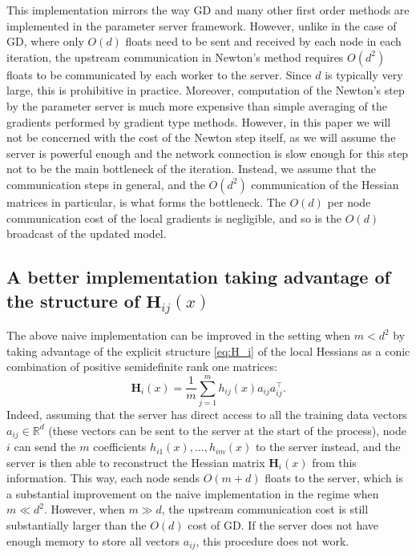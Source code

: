 \documentclass[12pt]{article}
\newcommand{\squeeze}{}
\newcommand{\R}{\mathbb{R}}
\newcommand{\newalpha}{h}
\newcommand{\mH}{\mathbf{H}}
\begin{document}
This implementation mirrors the way GD and many other first order methods are implemented in the parameter server framework. However, unlike in the case of GD, where only $O(d)$ floats need to be sent and received by each node in each iteration, the upstream communication in Newton's method requires $O(d^2)$ floats to be communicated by each worker to the server. Since $d$ is typically very large, this is prohibitive in practice. Moreover, computation of the Newton's step by the parameter server is much more expensive than simple averaging of the gradients performed by gradient type methods. However, in this paper we will not be concerned with the cost of the Newton step itself, as we will assume the server is powerful enough and the network connection is slow enough for this step not to be the main bottleneck of the iteration. Instead, we assume that the communication steps in general, and the $O(d^2)$ communication of the Hessian matrices in particular,  is what forms the bottleneck. The $O(d)$ per node communication cost of the local gradients is negligible,  and so is the $O(d)$ broadcast of the updated model.  

\subsection{A better implementation taking advantage of the structure of $\mH_{ij}(x)$} \label{subsec:Naive2}

The above naive implementation can be improved in the setting when $m < d^2$ by taking advantage of the explicit structure \eqref{eq:H_i} of the local Hessians as a conic combination of positive semidefinite rank one matrices:
\begin{equation}\label{eq:Newton2}
\squeeze\mH_i(x) = \frac{1}{m}\sum \limits_{j=1}^m \newalpha_{ij}(x) a_{ij}a_{ij}^\top.\end{equation}
Indeed, assuming that the server has direct access to all the training data vectors $a_{ij}\in \R^d$  (these vectors can be sent to the server at the start of the process), node $i$ can send the $m$ coefficients $\newalpha_{i1}(x), \dots, \newalpha_{im}(x)$ to the server instead, and the server is then able to reconstruct the Hessian matrix $\mH_i(x)$ from this information. This way, each node sends $O(m+d)$ floats to the server, which is a substantial improvement on the naive implementation in the regime when $m\ll d^2$.  However, when $m\gg d$, the upstream communication cost is still substantially larger than the $O(d)$ cost of GD.  If the server does not have enough memory to store all vectors $a_{ij}$, this procedure does not work.
\end{document}

